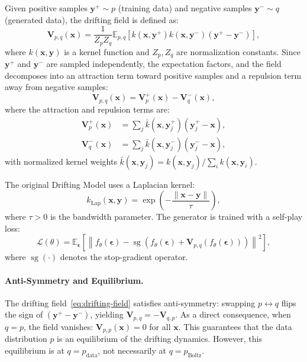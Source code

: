 \documentclass[11pt]{article}
\newcommand{\bx}{\mathbf{x}}
\newcommand{\by}{\mathbf{y}}
\newcommand{\bV}{\mathbf{V}}
\newcommand{\beps}{\boldsymbol{\epsilon}}
\newcommand{\E}{\mathbb{E}}
\newcommand{\kbar}{\bar{k}}
\newcommand{\pboltz}{p_{\text{Boltz}}}
\newcommand{\pdata}{p_{\text{data}}}
\newcommand{\sg}{\operatorname{sg}}
\begin{document}
Given positive samples $\by^+ \sim p$ (training data) and negative samples $\by^- \sim q$ (generated data), the drifting field is defined as:
\begin{equation}
    \bV_{p,q}(\bx) = \frac{1}{Z_p Z_q}\E_{p,q}\!\left[k(\bx,\by^+)k(\bx,\by^-)(\by^+ - \by^-)\right],
    \label{eq:drifting-field}
\end{equation}
where $k(\bx,\by)$ is a kernel function and $Z_p, Z_q$ are normalization constants.
Since $\by^+$ and $\by^-$ are sampled independently, the expectation factors, and the field decomposes into an attraction term toward positive samples and a repulsion term away from negative samples:
\begin{equation}
    \bV_{p,q}(\bx) = \bV_p^+(\bx) - \bV_q^-(\bx),
    \label{eq:decompose-V}
\end{equation}
where the attraction and repulsion terms are:
\begin{align}
    \bV_p^+(\bx) &= \sum_j \kbar(\bx,\by_j^+)(\by_j^+ - \bx), \label{eq:attraction} \\
    \bV_q^-(\bx) &= \sum_j \kbar(\bx,\by_j^-)(\by_j^- - \bx), \label{eq:repulsion}
\end{align}
with normalized kernel weights $\kbar(\bx,\by_j) = k(\bx,\by_j)/\sum_i k(\bx,\by_i)$.

The original Drifting Model uses a Laplacian kernel:
\begin{equation}
    k_{\text{Lap}}(\bx,\by) = \exp\!\left(-\frac{\|\bx - \by\|}{\tau}\right),
    \label{eq:laplacian-kernel}
\end{equation}
where $\tau > 0$ is the bandwidth parameter.
The generator is trained with a self-play loss:
\begin{equation}
    \mathcal{L}(\theta) = \E_{\beps}\!\left[\left\|f_\theta(\beps) - \sg\!\left(f_\theta(\beps) + \bV_{p,q}(f_\theta(\beps))\right)\right\|^2\right],
    \label{eq:drifting-loss}
\end{equation}
where $\sg(\cdot)$ denotes the stop-gradient operator.

\paragraph{Anti-Symmetry and Equilibrium.}
The drifting field~\eqref{eq:drifting-field} satisfies anti-symmetry: swapping $p \leftrightarrow q$ flips the sign of $(\by^+ - \by^-)$, yielding $\bV_{p,q} = -\bV_{q,p}$.
As a direct consequence, when $q = p$, the field vanishes: $\bV_{p,p}(\bx) = 0$ for all $\bx$.
This guarantees that the data distribution $p$ is an equilibrium of the drifting dynamics.
However, this equilibrium is at $q = \pdata$, not necessarily at $q = \pboltz$.
\end{document}

